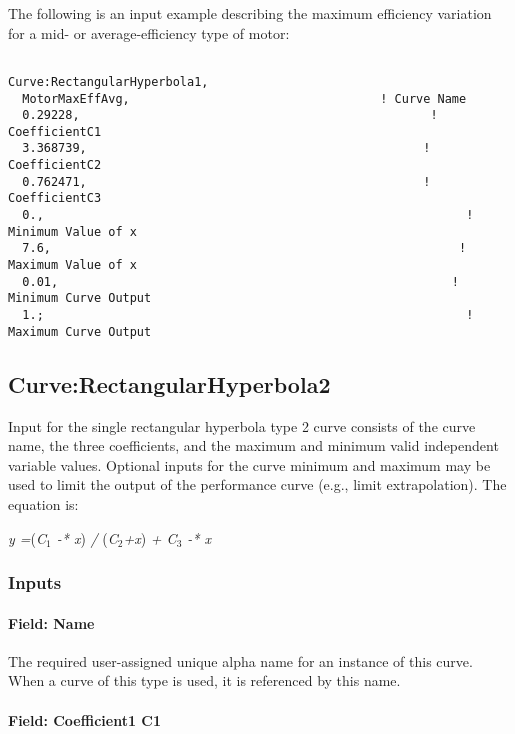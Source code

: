 The following is an input example describing the maximum efficiency variation for a mid- or average-efficiency type of motor:

\begin{lstlisting}

Curve:RectangularHyperbola1,
  MotorMaxEffAvg,                                   ! Curve Name
  0.29228,                                                 ! CoefficientC1
  3.368739,                                               ! CoefficientC2
  0.762471,                                               ! CoefficientC3
  0.,                                                           ! Minimum Value of x
  7.6,                                                         ! Maximum Value of x
  0.01,                                                       ! Minimum Curve Output
  1.;                                                           ! Maximum Curve Output
\end{lstlisting}

\subsection{Curve:RectangularHyperbola2}\label{curverectangularhyperbola2}

Input for the single rectangular hyperbola type 2 curve consists of the curve name, the three coefficients, and the maximum and minimum valid independent variable values. Optional inputs for the curve minimum and maximum may be used to limit the output of the performance curve (e.g., limit extrapolation). The equation is:

\emph{y =}(\emph{C\(_{1}\) -* x}) \emph{/} (\emph{C\(_{2}\)+x}) \emph{+ C\(_{3}\) -* x}

\subsubsection{Inputs}\label{inputs-16-007}

\paragraph{Field: Name}\label{field-name-16-005}

The required user-assigned unique alpha name for an instance of this curve. When a curve of this type is used, it is referenced by this name.

\paragraph{Field: Coefficient1 C1}\label{field-coefficient1-c1-3}

